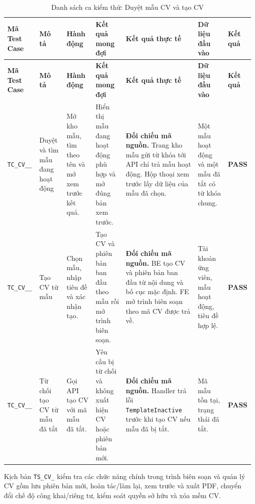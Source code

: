 \begin{landscape}
{
\fontsize{9.5}{11.5}\selectfont
\setlength{\tabcolsep}{3pt}
\renewcommand{\arraystretch}{1.2}
\begin{longtable}{|>{\raggedright\arraybackslash}p{2.1cm}|>{\raggedright\arraybackslash}p{2.8cm}|>{\raggedright\arraybackslash}p{3.8cm}|>{\raggedright\arraybackslash}p{4.0cm}|>{\raggedright\arraybackslash}p{5.0cm}|>{\raggedright\arraybackslash}p{3.2cm}|>{\centering\arraybackslash}p{1.3cm}|}
    \caption{Danh sách ca kiểm thử: Duyệt mẫu CV và tạo CV} \label{tab:ts-cv-01} \\
    \hline
    \textbf{Mã Test Case} & \textbf{Mô tả} & \textbf{Hành động} & \textbf{Kết quả mong đợi} & \textbf{Kết quả thực tế} & \textbf{Dữ liệu đầu vào} & \textbf{Kết quả} \\
    \hline
    \endfirsthead
    \hline
    \textbf{Mã Test Case} & \textbf{Mô tả} & \textbf{Hành động} & \textbf{Kết quả mong đợi} & \textbf{Kết quả thực tế} & \textbf{Dữ liệu đầu vào} & \textbf{Kết quả} \\
    \hline
    \endhead
    \hline
    \endfoot
    \hline
    \endlastfoot
    \texttt{TC\_\allowbreak CV\_\allowbreak 01\_\allowbreak 01} & Duyệt và tìm mẫu đang hoạt động & Mở kho mẫu, tìm theo tên và mở xem trước kết quả. & Hiển thị mẫu đang hoạt động phù hợp và mở đúng bản xem trước. & \textbf{Đối chiếu mã nguồn.} Trang kho mẫu gửi từ khóa tới API chỉ trả mẫu hoạt động. Hộp thoại xem trước lấy dữ liệu của mẫu đã chọn. & Một mẫu hoạt động và một mẫu đã tắt có từ khóa chung. & \textbf{PASS} \\
    \hline
    \texttt{TC\_\allowbreak CV\_\allowbreak 01\_\allowbreak 02} & Tạo CV từ mẫu & Chọn mẫu, nhập tiêu đề và xác nhận tạo. & Tạo CV và phiên bản ban đầu theo mẫu rồi mở trình biên soạn. & \textbf{Đối chiếu mã nguồn.} BE tạo CV và phiên bản ban đầu từ nội dung và bố cục mặc định. FE mở trình biên soạn theo mã CV được trả về. & Tài khoản ứng viên, mẫu hoạt động, tiêu đề hợp lệ. & \textbf{PASS} \\
    \hline
    \texttt{TC\_\allowbreak CV\_\allowbreak 01\_\allowbreak 03} & Từ chối tạo CV từ mẫu đã tắt & Gọi API tạo CV với mã mẫu đã tắt. & Yêu cầu bị từ chối và không xuất hiện CV hoặc phiên bản mới. & \textbf{Đối chiếu mã nguồn.} Handler trả lỗi \texttt{TemplateInactive} trước khi tạo CV nếu mẫu đã bị tắt. & Mã mẫu tồn tại, trạng thái đã tắt. & \textbf{PASS} \\
    \hline
\end{longtable}
}

Kịch bản \texttt{TS\_\allowbreak CV\_} kiểm tra các chức năng chính trong trình biên soạn và quản lý CV gồm lưu phiên bản mới, hoàn tác/làm lại, xem trước và xuất PDF, chuyển đổi chế độ công khai/riêng tư, kiểm soát quyền sở hữu và xóa mềm CV.


\end{landscape}
